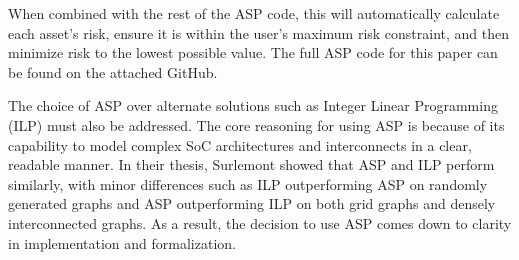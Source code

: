 When combined with the rest of the ASP code, this will automatically calculate each asset's risk, ensure it is within the user's maximum risk constraint, and then minimize risk to the lowest possible value. The full ASP code for this paper can be found on the attached GitHub. 

The choice of ASP over alternate solutions such as Integer Linear Programming (ILP) must also be addressed. The core reasoning for using ASP is because of its capability to model complex SoC architectures and interconnects in a clear, readable manner. In their thesis, Surlemont \cite{surlemont_solving_2020} showed that ASP and ILP perform similarly, with minor differences such as ILP outperforming ASP on randomly generated graphs and ASP outperforming ILP on both grid graphs and densely interconnected graphs. As a result, the decision to use ASP comes down to clarity in implementation and formalization. 

